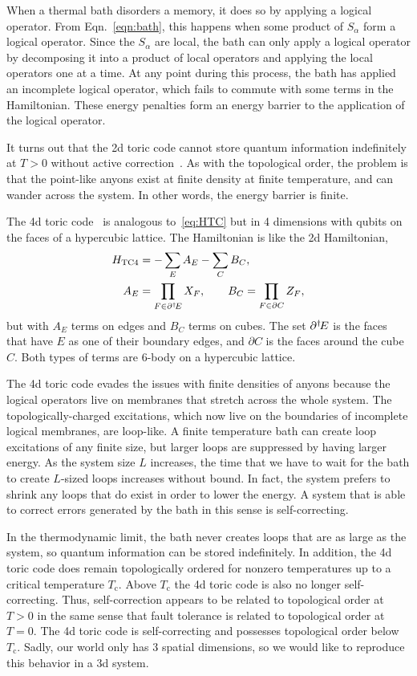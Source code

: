 When a thermal bath disorders a memory, it does so by applying a logical operator. From Eqn.~\ref{eqn:bath}, this happens when some product of $S_\alpha$ form a logical operator. Since the $S_\alpha$ are local, the bath can only apply a logical operator by decomposing it into a product of local operators and applying the local operators one at a time. At any point during this process, the bath has applied an incomplete logical operator, which fails to commute with some terms in the Hamiltonian. These energy penalties form an energy barrier to the application of the logical operator.

It turns out that the 2d toric code cannot store quantum information indefinitely at $T>0$ without active correction~\cite{Dennis2002Topological}. As with the topological order, the problem is that the point-like anyons exist at finite density at finite temperature, and can wander across the system. In other words, the energy barrier is finite.

The 4d toric code~\cite{Dennis2002Topological} is analogous to~\eqref{eq:HTC} but in 4 dimensions with qubits on the faces of a hypercubic lattice. The Hamiltonian is like the 2d Hamiltonian, 
\begin{align}
H_\text{TC4} &= -\sum_E A_E - \sum_C B_C,\\
A_E &= \prod_{F\in\partial^\dagger\! E} X_F,\qquad B_C = \prod_{F \in \partial C} Z_F, \label{eq:HTC4}
\end{align}
but with $A_E$ terms on edges and $B_C$ terms on cubes. The set $\partial^\dagger\! E$ is the faces that have $E$ as one of their boundary edges, and $\partial C$ is the faces around the cube $C$. Both types of terms are 6-body on a hypercubic lattice. 

The 4d toric code evades the issues with finite densities of anyons because the logical operators live on membranes that stretch across the whole system. The topologically-charged excitations, which now live on the boundaries of incomplete logical membranes, are loop-like. A finite temperature bath can create loop excitations of any finite size, but larger loops are suppressed by having larger energy. As the system size $L$ increases, the time that we have to wait for the bath to create $L$-sized loops increases without bound. In fact, the system prefers to shrink any loops that do exist in order to lower the energy. A system that is able to correct errors generated by the bath in this sense is  self-correcting.

In the thermodynamic limit, the bath never creates loops that are as large as the system, so quantum information can be stored indefinitely. In addition, the 4d toric code does remain topologically ordered for nonzero temperatures up to a critical temperature $T_\text{c}$. Above $T_\text{c}$ the 4d toric code is also no longer self-correcting. Thus, self-correction appears to be related to topological order at $T>0$ in the same sense that fault tolerance is related to topological order at $T=0$. The 4d toric code is self-correcting and possesses topological order below $T_\text{c}$. 
Sadly, our world only has 3 spatial dimensions, so we would like to reproduce this behavior in a 3d system.

